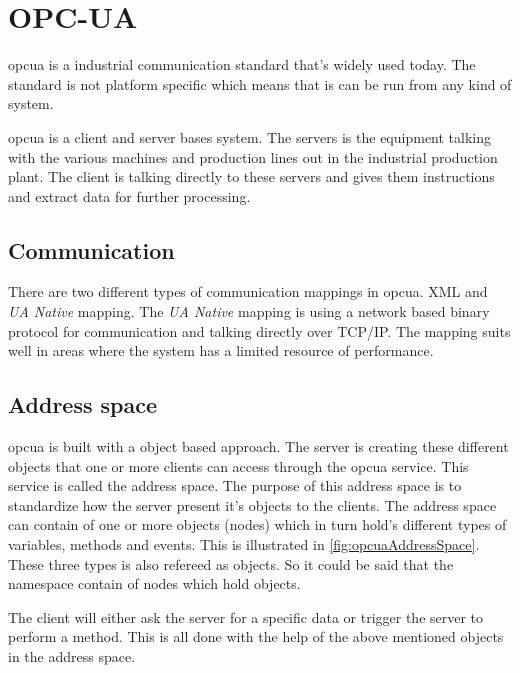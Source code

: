 \section{OPC-UA} \label{opcua}
\acrshort{opcua} is a industrial communication standard that's widely used today. The standard is not platform specific which means that is can be run from any kind of system.

\acrshort{opcua} is a client and server bases system. The servers is the equipment talking with the various machines and production lines out in the industrial production plant. The client is talking directly to these servers and gives them instructions and extract data for further processing. \cite{opcuaAbb}



\subsection{Communication} \label{opcuaCommunication}
There are two different types of communication mappings in \acrshort{opcua}.
XML and \textit{UA Native} mapping.
The \textit{UA Native} mapping is using a network based binary protocol for communication and talking directly over TCP/IP. The mapping suits well in areas where the system has a limited resource of performance. \cite{adoptingOpcua, opcuaAbb}


\subsection{Address space} \label{opcuaAddressSpace}
\acrshort{opcua} is built with a object based approach. The server is creating these different objects that one or more clients can access through the \acrshort{opcua} service. This service is called the address space. The purpose of this address space is to standardize how the server present it's objects to the clients.
The address space can contain of one or more objects (nodes) which in turn hold's different types of variables, methods and events. This is illustrated in \cref{fig:opcuaAddressSpace}. These three types is also refereed as objects. So it could be said that the namespace contain of nodes which hold objects. \cite{adoptingOpcua, opcuaAbb}


The client will either ask the server for a specific data or trigger the server to perform a method. This is all done with the help of the above mentioned objects in the address space.

